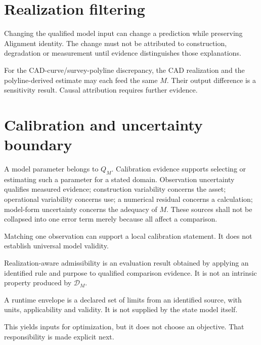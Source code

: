 \section{Realization filtering}

\begin{proposition}
\label{prop:realization-filter-principle}
Changing the qualified model input can change a prediction while preserving
Alignment identity. The change must not be attributed to construction,
degradation or measurement until evidence distinguishes those explanations.
\end{proposition}

For the CAD-curve/survey-polyline discrepancy, the CAD realization and the
polyline-derived estimate may each feed the same \(M\). Their output
difference is a sensitivity result. Causal attribution requires further
evidence.

\section{Calibration and uncertainty boundary}

A model parameter belongs to \(Q_M\). Calibration evidence supports selecting
or estimating such a parameter for a stated domain. Observation uncertainty
qualifies measured evidence; construction variability concerns the asset;
operational variability concerns use; a numerical residual concerns a
calculation; model-form uncertainty concerns the adequacy of \(M\). These
sources shall not be collapsed into one error term merely because all affect a
comparison.

Matching one observation can support a local calibration statement. It does
not establish universal model validity.

\begin{definition}
\label{def:realization-aware-admissibility}
Realization-aware admissibility is an evaluation result obtained by applying
an identified rule and purpose to qualified comparison evidence. It is not an
intrinsic property produced by \(\mathcal D_M\).
\end{definition}

\begin{definition}
\label{def:runtime-envelope}
A runtime envelope is a declared set of limits from an identified source,
with units, applicability and validity. It is not supplied by the state model
itself.
\end{definition}

This yields inputs for optimization, but it does not choose an objective.
That responsibility is made explicit next.
